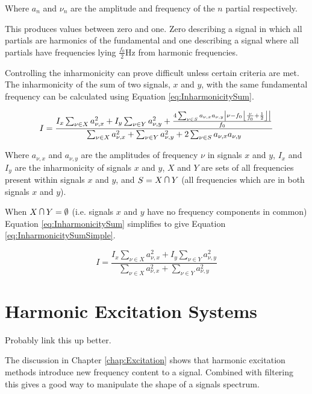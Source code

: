 		Where $a_{n}$ and $\nu_{n}$ are the amplitude and frequency of the $n$ partial respectively.

		This produces values between zero and one. Zero describing a signal in which all partials are harmonics of
		the fundamental and one describing a signal where all partials have frequencies lying $\frac{f_{0}}{2}$Hz
		from harmonic frequencies.

		Controlling the inharmonicity can prove difficult unless certain criteria are met. The inharmonicity of the
		sum of two signals, $x$ and $y$, with the same fundamental frequency can be calculated using Equation
		\ref{eq:InharmonicitySum}.

		\begin{equation}
			I = \frac{I_{x}\sum_{\nu \in X} a_{\nu,x}^{2} + I_{y}\sum_{\nu \in Y} a_{\nu,y}^{2}
			    + \frac{4\sum_{\nu \in S} a_{\nu,x}a_{\nu,y}
			            \left|\nu - f_{0}\left\lfloor\frac{\nu}{f_{0}} + \frac{1}{2}\right\rfloor\right|}
			           {f_{0}}}
				 {\sum_{\nu \in X} a_{\nu,x}^{2} + \sum_{\nu \in Y} a_{\nu,y}^{2}
				  + 2\sum_{\nu \in S} a_{\nu,x}a_{\nu,y}}
			\label{eq:InharmonicitySum}
		\end{equation}

		Where $a_{\nu,x}$ and $a_{\nu,y}$ are the amplitudes of frequency $\nu$ in signals $x$ and $y$, $I_{x}$ and
		$I_{y}$ are the inharmonicity of signals $x$ and $y$, $X$ and $Y$ are sets of all frequencies present within
		signals $x$ and $y$, and $S = X \medcap Y$ (all frequencies which are in both signals $x$ and $y$).

		When $X \medcap Y = \emptyset$ (i.e. signals $x$ and $y$ have no frequency components in common) Equation
		\ref{eq:InharmonicitySum} simplifies to give Equation \ref{eq:InharmonicitySumSimple}.

		\begin{equation}
			I = \frac{I_{x}\sum_{\nu \in X} a_{\nu,x}^{2} + I_{y}\sum_{\nu \in Y} a_{\nu,y}^{2}}
			         {\sum_{\nu \in X} a_{\nu,x}^{2} + \sum_{\nu \in Y} a_{\nu,y}^{2}}
			\label{eq:InharmonicitySumSimple}
		\end{equation}

\section{Harmonic Excitation Systems}
\label{sec:FeatureControl-Systems}
	\todo
	{
		Probably link this up better.

		The discussion in Chapter \ref{chap:Excitation} shows that harmonic excitation methods introduce new
		frequency content to a signal. Combined with filtering this gives a good way to manipulate the shape of a
		signals spectrum.

	}

